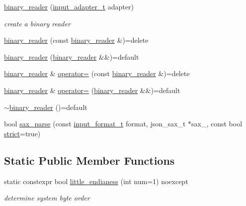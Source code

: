 \begin{DoxyCompactItemize}
\item 
\mbox{\hyperlink{classnlohmann_1_1detail_1_1binary__reader_aed84f0302eb232d3b69f7653bef2337a}{binary\+\_\+reader}} (\mbox{\hyperlink{namespacenlohmann_1_1detail_ae132f8cd5bb24c5e9b40ad0eafedf1c2}{input\+\_\+adapter\+\_\+t}} adapter)
\begin{DoxyCompactList}\small\item\em create a binary reader \end{DoxyCompactList}\item 
\mbox{\hyperlink{classnlohmann_1_1detail_1_1binary__reader_aacbece7dfa1698dfb3f22c90922d7244}{binary\+\_\+reader}} (const \mbox{\hyperlink{classnlohmann_1_1detail_1_1binary__reader}{binary\+\_\+reader}} \&)=delete
\item 
\mbox{\hyperlink{classnlohmann_1_1detail_1_1binary__reader_a254d91b10c2f4579634b6f70ffc1ef16}{binary\+\_\+reader}} (\mbox{\hyperlink{classnlohmann_1_1detail_1_1binary__reader}{binary\+\_\+reader}} \&\&)=default
\item 
\mbox{\hyperlink{classnlohmann_1_1detail_1_1binary__reader}{binary\+\_\+reader}} \& \mbox{\hyperlink{classnlohmann_1_1detail_1_1binary__reader_a87826b833ee7fec146c97233bb0f6ab8}{operator=}} (const \mbox{\hyperlink{classnlohmann_1_1detail_1_1binary__reader}{binary\+\_\+reader}} \&)=delete
\item 
\mbox{\hyperlink{classnlohmann_1_1detail_1_1binary__reader}{binary\+\_\+reader}} \& \mbox{\hyperlink{classnlohmann_1_1detail_1_1binary__reader_a7ba0e555da725a2efa17048e67aec9a9}{operator=}} (\mbox{\hyperlink{classnlohmann_1_1detail_1_1binary__reader}{binary\+\_\+reader}} \&\&)=default
\item 
\mbox{\hyperlink{classnlohmann_1_1detail_1_1binary__reader_a18e0a63e22dbdad5f6964276b81b813a}{$\sim$binary\+\_\+reader}} ()=default
\item 
bool \mbox{\hyperlink{classnlohmann_1_1detail_1_1binary__reader_ab94a54d6e595c2620b07589cf4116256}{sax\+\_\+parse}} (const \mbox{\hyperlink{namespacenlohmann_1_1detail_aa554fc6a11519e4f347deb25a9f0db40}{input\+\_\+format\+\_\+t}} format, json\+\_\+sax\+\_\+t $\ast$sax\+\_\+, const bool \mbox{\hyperlink{namespacenlohmann_1_1detail_a5a76b60b26dc8c47256a996d18d967dfa2133fd717402a7966ee88d06f9e0b792}{strict}}=true)
\end{DoxyCompactItemize}
\subsection*{Static Public Member Functions}
\begin{DoxyCompactItemize}
\item 
static constexpr bool \mbox{\hyperlink{classnlohmann_1_1detail_1_1binary__reader_a1e31dbfcf9567c8c2d4f0e4eb1b0230a}{little\+\_\+endianess}} (int num=1) noexcept
\begin{DoxyCompactList}\small\item\em determine system byte order \end{DoxyCompactList}\end{DoxyCompactItemize}


